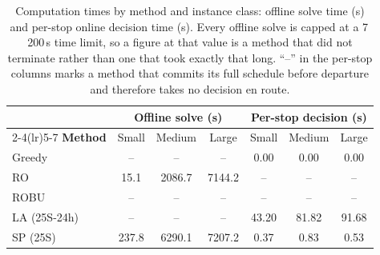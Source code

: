 \begin{table}[htbp]
\centering
\caption{Computation times by method and instance class: offline solve time (s) and per-stop online decision time (s).  Every offline solve is capped at a 7\,200\,s time limit, so a figure at that value is a method that did not terminate rather than one that took exactly that long.  ``--'' in the per-stop columns marks a method that commits its full schedule before departure and therefore takes no decision en route.}
\label{tab:runtime}
\begin{tabular}{lcccccc}
\toprule
& \multicolumn{3}{c}{\textbf{Offline solve (s)}} & \multicolumn{3}{c}{\textbf{Per-stop decision (s)}}\\
\cmidrule(lr){2-4}\cmidrule(lr){5-7}
\textbf{Method} & Small & Medium & Large & Small & Medium & Large\\
\midrule
Greedy & -- & -- & -- & 0.00 & 0.00 & 0.00 \\
RO & 15.1 & 2086.7 & 7144.2 & -- & -- & -- \\
ROBU & -- & -- & -- & -- & -- & -- \\
LA (25S-24h) & -- & -- & -- & 43.20 & 81.82 & 91.68 \\
SP (25S) & 237.8 & 6290.1 & 7207.2 & 0.37 & 0.83 & 0.53 \\
\bottomrule
\end{tabular}
\end{table}

